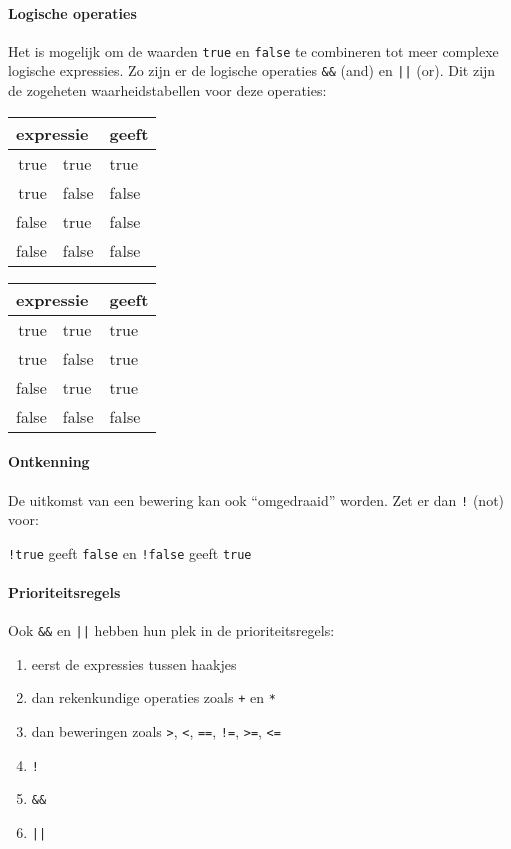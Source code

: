 \paragraph{Logische operaties}

Het is mogelijk om de waarden \texttt{true} en \texttt{false} te combineren tot meer complexe logische expressies. Zo zijn er de logische operaties \texttt{\&\&} (and) en \texttt{||} (or). Dit zijn de zogeheten waarheidstabellen voor deze operaties:

\begin{center}
  \ttfamily
  \begin{tabular}{r@{ \&\& }l@{\qquad}l}
    \multicolumn{2}{l}{\normalfont expressie} & {\normalfont geeft} \\
    \midrule
    true & true   & true \\
    true & false & false \\
    false & true  & false \\
    false & false  & false \\
    \midrule
  \end{tabular}
  \qquad
  \begin{tabular}{r@{ || }l@{\qquad}l}
    \multicolumn{2}{l}{\normalfont expressie} & {\normalfont geeft} \\
    \midrule
    true  & true   & true \\
    true  & false  & true \\
    false & true   & true \\
    false & false  & false \\
    \midrule
  \end{tabular}
\end{center}

\paragraph{Ontkenning}

De uitkomst van een bewering kan ook ``omgedraaid'' worden. Zet er dan \texttt{!} (not) voor:

\begin{center}
  \texttt{!true} \quad  geeft \quad  \texttt{false} \qquad  en \qquad  \texttt{!false} \quad geeft \quad \texttt{true}
\end{center}

\paragraph{Prioriteitsregels}

Ook \texttt{\&\&} en \texttt{||} hebben hun plek in de prioriteitsregels:

\begin{enumerate}
  \item eerst de expressies tussen haakjes
  \item dan rekenkundige operaties zoals \texttt{+} en \texttt{*}
  \item dan beweringen zoals \texttt{>}, \texttt{<}, \texttt{==}, \texttt{!=}, \texttt{>=}, \texttt{<=}
  \item \texttt{!}
  \item \texttt{\&\&}
  \item \texttt{||}
\end{enumerate}
